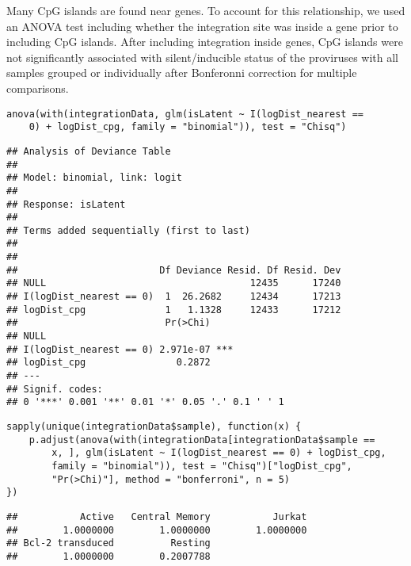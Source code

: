 \documentclass[../../sherrill-Mix_thesis.tex]{subfiles}
\makeatletter
\newenvironment{kframe}{%
 \def\at@end@of@kframe{}%
 \ifinner\ifhmode%
  \def\at@end@of@kframe{\end{minipage}}%
  \begin{minipage}{\columnwidth}%
 \fi\fi%
 \def\FrameCommand##1{\hskip\@totalleftmargin \hskip-\fboxsep
 \colorbox{shadecolor}{##1}\hskip-\fboxsep
     \hskip-\linewidth \hskip-\@totalleftmargin \hskip\columnwidth}%
 \MakeFramed {\advance\hsize-\width
   \@totalleftmargin\z@ \linewidth\hsize
   \@setminipage}}%
 {\par\unskip\endMakeFramed%
 \at@end@of@kframe}
\newenvironment{knitrout}{}{} %
\makeatother
\begin{document}
Many CpG islands are found near genes. To account for this relationship, we used an ANOVA test including whether the integration site was inside a gene prior to including CpG islands. After including integration inside genes, CpG islands were not significantly associated with silent/inducible status of the proviruses with all samples grouped or individually after Bonferonni correction for multiple comparisons.
\begin{knitrout}
\color{fgcolor}\begin{kframe}
\begin{lstlisting}[basicstyle=\ttfamily,breaklines=true]
anova(with(integrationData, glm(isLatent ~ I(logDist_nearest == 
    0) + logDist_cpg, family = "binomial")), test = "Chisq")\end{lstlisting}
\begin{lstlisting}[basicstyle=\ttfamily,breaklines=true]
## Analysis of Deviance Table
## 
## Model: binomial, link: logit
## 
## Response: isLatent
## 
## Terms added sequentially (first to last)
## 
## 
##                         Df Deviance Resid. Df Resid. Dev
## NULL                                    12435      17240
## I(logDist_nearest == 0)  1  26.2682     12434      17213
## logDist_cpg              1   1.1328     12433      17212
##                          Pr(>Chi)    
## NULL                                 
## I(logDist_nearest == 0) 2.971e-07 ***
## logDist_cpg                0.2872    
## ---
## Signif. codes:  
## 0 '***' 0.001 '**' 0.01 '*' 0.05 '.' 0.1 ' ' 1
\end{lstlisting}
\begin{lstlisting}[basicstyle=\ttfamily,breaklines=true]
sapply(unique(integrationData$sample), function(x) {
    p.adjust(anova(with(integrationData[integrationData$sample == 
        x, ], glm(isLatent ~ I(logDist_nearest == 0) + logDist_cpg, 
        family = "binomial")), test = "Chisq")["logDist_cpg", 
        "Pr(>Chi)"], method = "bonferroni", n = 5)
})\end{lstlisting}
\begin{lstlisting}[basicstyle=\ttfamily,breaklines=true]
##           Active   Central Memory           Jurkat 
##        1.0000000        1.0000000        1.0000000 
## Bcl-2 transduced          Resting 
##        1.0000000        0.2007788
\end{lstlisting}
\end{kframe}
\end{knitrout}
\end{document}
